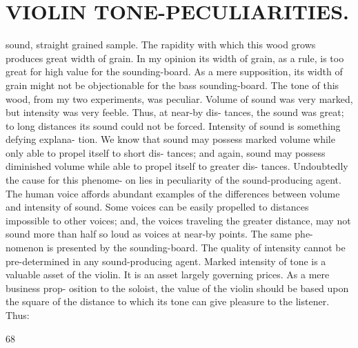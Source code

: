\documentclass{article}
\begin{document}
\section*{VIOLIN TONE-PECULIARITIES.}
sound, straight grained sample. The rapidity with which this wood grows produces great width of grain. In my opinion its width of grain, as a rule, is too great for high value for the sounding-board. As a mere supposition, its width of grain might not be objectionable for the bass sounding-board. The tone of this wood, from my two experiments, was peculiar. Volume of sound was very marked, but intensity was very feeble. Thus, at near-by dis- tances, the sound was great; to long distances its sound could not be forced. Intensity of sound is something defying explana- tion. We know that sound may possess marked volume while only able to propel itself to short dis- tances; and again, sound may possess diminished volume while able to propel itself to greater dis- tances. Undoubtedly the cause for this phenome- on lies in peculiarity of the sound-producing agent. The human voice affords abundant examples of the differences between volume and intensity of sound. Some voices can be easily propelled to distances impossible to other voices; and, the voices traveling the greater distance, may not sound more than half so loud as voices at near-by points. The same phe- nomenon is presented by the sounding-board. The quality of intensity cannot be pre-determined in any sound-producing agent. Marked intensity of tone is a valuable asset of the violin. It is an asset largely governing prices. As a mere business prop- osition to the soloist, the value of the violin should be based upon the square of the distance to which its tone can give pleasure to the listener. Thus:

68
\end{document}
